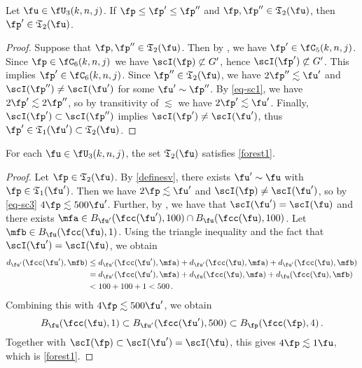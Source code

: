 \begin{lemma}[C6 convex]
    \label{C6-convex}
    Let $\fu \in \fU_3(k,n,j)$. If $\fp \le \fp' \le \fp''$ and $\fp, \fp'' \in \mathfrak{T}_2(\fu)$, then $\fp' \in \mathfrak{T}_2(\fu)$.
\end{lemma}

\begin{proof}
    Suppose that $\fp, \fp'' \in \mathfrak{T}_2(\fu)$. Then by , we have
$\fp' \in \fC_5(k,n,j)$. Since $\fp \in \fC_6(k,n,j)$ we have $\scI(\fp) \not\subset G'$, hence $\scI(\fp') \not \subset G'$. This implies $\fp' \in \fC_6(k,n,j)$. Since $\fp'' \in \mathfrak{T}_2(\fu)$, we have $2\fp'' \lesssim \fu'$ and $\scI(\fp'')\ne\scI(\fu')$ for some $\fu' \sim \fp''$. By \eqref{eq-sc1}, we have $2\fp' \lesssim 2\fp''$, so by transitivity of $\lesssim$ we have $2\fp' \lesssim \fu'$. Finally, $\scI(\fp') \subset \scI(\fp'')$ implies $\scI(\fp') \ne \scI(\fu')$, thus $\fp' \in \mathfrak{T}_1(\fu') \subset \mathfrak{T}_2(\fu)$.
\end{proof}


\begin{lemma}
    \label{forest-geometry}
    For each $\fu\in \fU_3(k,n,j)$,
    the set $\mathfrak{T}_2(\fu)$
    satisfies \eqref{forest1}.
\end{lemma}
\begin{proof}
    Let $\fp \in \mathfrak{T}_2(\fu)$. By \eqref{definesv}, there exists $\fu' \sim \fu$ with $\fp \in \mathfrak{T}_1(\fu')$. Then we have $2\fp \lesssim \fu'$ and $\scI(\fp) \ne \scI(\fu')$, so by \eqref{eq-sc3} $4\fp \lesssim 500\fu'$.
    Further, by , we have that $\scI(\fu') = \scI(\fu)$ and there exists $\mfa \in B_{\fu'}(\fcc(\fu'),100) \cap B_{\fu}(\fcc(\fu),100)$.
    Let $\mfb \in B_{\fu}(\fcc(\fu), 1)$.
    Using the triangle inequality and the fact that $\scI(\fu') =\scI(\fu)$, we obtain
    \begin{align*}
        d_{\fu'}(\fcc(\fu'), \mfb) &\le d_{\fu'}(\fcc(\fu'), \mfa) + d_{\fu'}(\fcc(\fu), \mfa) + d_{\fu'}(\fcc(\fu), \mfb)\\
        &= d_{\fu'}(\fcc(\fu'), \mfa) + d_{\fu}(\fcc(\fu), \mfa) + d_{\fu}(\fcc(\fu), \mfb)\\
        &< 100 + 100 + 1 < 500\,.
    \end{align*}
    Combining this with $4\fp \lesssim 500\fu'$, we obtain
    $$
        B_{\fu}(\fcc(\fu), 1) \subset B_{\fu'}(\fcc(\fu'), 500) \subset B_{\fp}(\fcc(\fp), 4)\,.
    $$
    Together with $\scI(\fp) \subset \scI(\fu') = \scI(\fu)$, this gives $4\fp \lesssim 1\fu$, which is \eqref{forest1}.
\end{proof}

